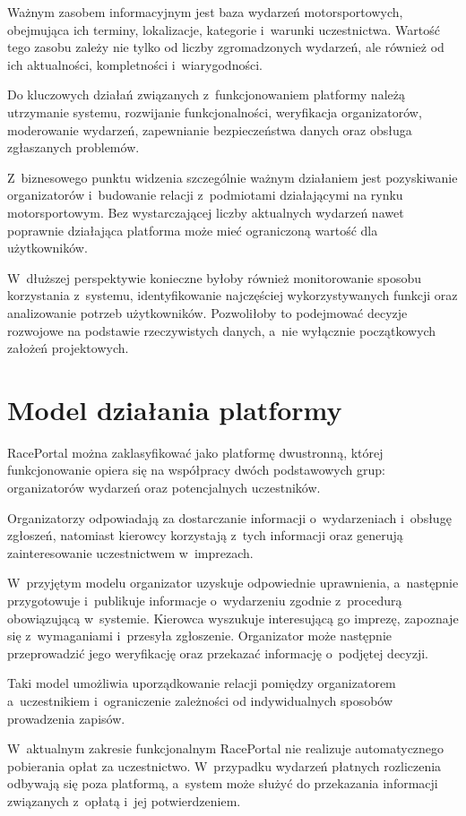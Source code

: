 \documentclass{sprz}
\begin{document}
Ważnym zasobem informacyjnym jest baza wydarzeń motorsportowych, obejmująca ich terminy, lokalizacje, kategorie i~warunki uczestnictwa. Wartość tego zasobu zależy nie tylko od liczby zgromadzonych wydarzeń, ale również od ich aktualności, kompletności i~wiarygodności.

Do kluczowych działań związanych z~funkcjonowaniem platformy należą utrzymanie systemu, rozwijanie funkcjonalności, weryfikacja organizatorów, moderowanie wydarzeń, zapewnianie bezpieczeństwa danych oraz obsługa zgłaszanych problemów.

Z~biznesowego punktu widzenia szczególnie ważnym działaniem jest pozyskiwanie organizatorów i~budowanie relacji z~podmiotami działającymi na rynku motorsportowym. Bez wystarczającej liczby aktualnych wydarzeń nawet poprawnie działająca platforma może mieć ograniczoną wartość dla użytkowników.

W~dłuższej perspektywie konieczne byłoby również monitorowanie sposobu korzystania z~systemu, identyfikowanie najczęściej wykorzystywanych funkcji oraz analizowanie potrzeb użytkowników. Pozwoliłoby to podejmować decyzje rozwojowe na podstawie rzeczywistych danych, a~nie wyłącznie początkowych założeń projektowych.

\section{Model działania platformy}
RacePortal można zaklasyfikować jako platformę dwustronną, której funkcjonowanie opiera się na współpracy dwóch podstawowych grup: organizatorów wydarzeń oraz potencjalnych uczestników.

Organizatorzy odpowiadają za dostarczanie informacji o~wydarzeniach i~obsługę zgłoszeń, natomiast kierowcy korzystają z~tych informacji oraz generują zainteresowanie uczestnictwem w~imprezach.

W~przyjętym modelu organizator uzyskuje odpowiednie uprawnienia, a~następnie przygotowuje i~publikuje informacje o~wydarzeniu zgodnie z~procedurą obowiązującą w~systemie. Kierowca wyszukuje interesującą go imprezę, zapoznaje się z~wymaganiami i~przesyła zgłoszenie. Organizator może następnie przeprowadzić jego weryfikację oraz przekazać informację o~podjętej decyzji.

Taki model umożliwia uporządkowanie relacji pomiędzy organizatorem a~uczestnikiem i~ograniczenie zależności od indywidualnych sposobów prowadzenia zapisów.

W~aktualnym zakresie funkcjonalnym RacePortal nie realizuje automatycznego pobierania opłat za uczestnictwo. W~przypadku wydarzeń płatnych rozliczenia odbywają się poza platformą, a~system może służyć do przekazania informacji związanych z~opłatą i~jej potwierdzeniem.
\end{document}
